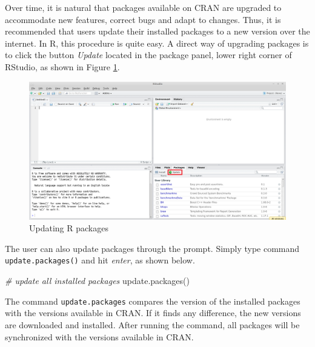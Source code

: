 \documentclass[
  12pt,
]{book}
\newenvironment{Shaded}{\begin{snugshade}}{\end{snugshade}}
\newcommand{\CommentTok}[1]{\textcolor[rgb]{0.37,0.37,0.37}{\textit{#1}}}
\newcommand{\FunctionTok}[1]{\textcolor[rgb]{0,0,0}{#1}}
\newcommand{\NormalTok}[1]{#1}
\begin{document}
Over time, it is natural that packages available on CRAN are upgraded to accommodate new features, correct bugs and adapt to changes. Thus, it is recommended that users update their installed packages to a new version over the internet. In R, this procedure is quite easy. A direct way of upgrading packages is to click the button \emph{Update} located in the package panel, lower right corner of RStudio, as shown in Figure \ref{fig:RStudio-update}.

\begin{figure}[!htbp]

{\centering \includegraphics[width=1\linewidth]{figs/RStudio_update} 

}

\caption{Updating R packages}\label{fig:RStudio-update}
\end{figure}

The user can also update packages through the prompt. Simply type command \texttt{update.packages()} and hit \emph{enter}, as shown below. 

\begin{Shaded}
\begin{Highlighting}[]
\CommentTok{\# update all installed packages}
\FunctionTok{update.packages}\NormalTok{()}
\end{Highlighting}
\end{Shaded}

The command \texttt{update.packages} compares the version of the installed packages with the versions available in CRAN. If it finds any difference, the new versions are downloaded and installed. After running the command, all packages will be synchronized with the versions available in CRAN.
\end{document}
